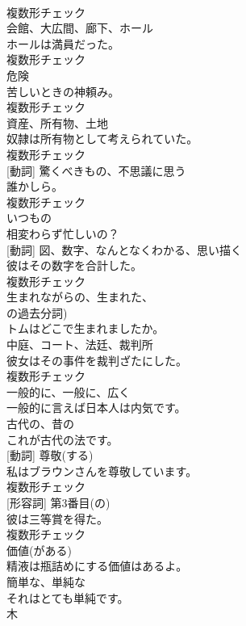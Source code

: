 \documentclass[8pt]{extreport}
\begin{document}
\begin{CJK}{UTF8}{min}
\\	複数形チェック
\\	[名詞]	会館、大広間、廊下、ホール	
\\	ホールは満員だった。	
\\	複数形チェック
\\	[名詞]	危険	
\\	苦しいときの神頼み。	
\\	複数形チェック
\\	[名詞]	資産、所有物、土地	
\\	奴隷は所有物として考えられていた。	
\\	複数形チェック
\\	[名詞] [動詞]	驚くべきもの、不思議に思う	
\\	誰かしら。	
\\	複数形チェック
\\	[形容詞]	いつもの	
\\	相変わらず忙しいの？	
\\	[名詞] [動詞]	図、数字、なんとなくわかる、思い描く	
\\	彼はその数字を合計した。	
\\	複数形チェック
\\	[形容詞]	生まれながらの、生まれた、
\\	の過去分詞)	
\\	トムはどこで生まれましたか。	
\\	[名詞]	中庭、コート、法廷、裁判所	
\\	彼女はその事件を裁判ざたにした。	
\\	複数形チェック
\\	[副詞]	一般的に、一般に、広く	
\\	一般的に言えば日本人は内気です。	
\\	[形容詞]	古代の、昔の	
\\	これが古代の法です。	
\\	[名詞] [動詞]	尊敬(する)	
\\	私はブラウンさんを尊敬しています。	
\\	複数形チェック
\\	[名詞] [形容詞]	第3番目(の)	
\\	彼は三等賞を得た。	
\\	複数形チェック
\\	[形容詞]	価値(がある)	
\\	精液は瓶詰めにする価値はあるよ。	
\\	[形容詞]	簡単な、単純な	
\\	それはとても単純です。	
\\	[名詞]	木	

\end{CJK}
\end{document}
